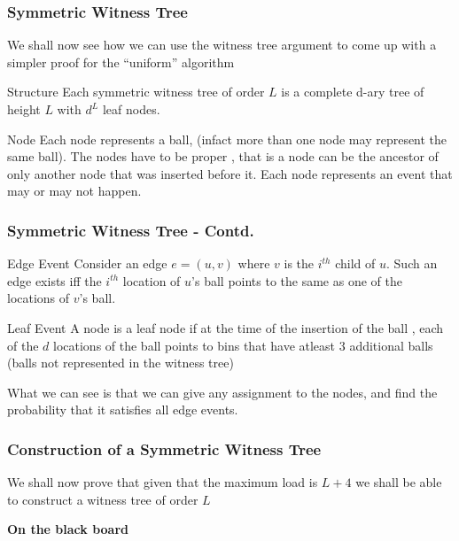\documentclass{beamer}
\begin{document}
\begin{frame}
\frametitle{Symmetric Witness Tree}
We shall now see how we can use the witness tree argument to come up with a simpler proof for the ``uniform'' algorithm\\
\begin{block}
{Structure} Each symmetric witness tree of order $L$ is a complete d-ary tree of height $L$ with $d^{L}$ leaf nodes. 
\end{block}
\begin{block}
{Node} Each node represents a ball, (infact more than one node may represent the same ball). The nodes have to be proper , that is a node can be the ancestor of only another node that was inserted before it. Each node represents an event that may or may not happen. 
\end{block}
 

\end{frame}

\begin{frame}
\frametitle{Symmetric Witness Tree - Contd.}

\begin{block}
{Edge Event} Consider an edge $e=(u,v)$ where $v$ is the $i^{th}$ child of $u$. Such an edge exists iff the $i^{th}$ location of $u$'s ball points to the same as one of the locations of $v$'s ball. 
\end{block}
\begin{block}
{Leaf Event} A node is a leaf node if at the time of the insertion of the ball , each of the $d$ locations of the ball points to bins that have atleast $3$ additional balls (balls not represented in the witness tree)
\end{block}
What we can see is that we can give any assignment to the nodes, and find the probability that it satisfies all edge events. 

\end{frame}

\begin{frame}
\frametitle{Construction of a Symmetric Witness Tree}
We shall now prove that given that the maximum load is $L+4$ we shall be able to construct a witness tree of order $L$
\begin{center}
 \textbf{On the black board}
\end{center}

\end{frame}
\end{document}
